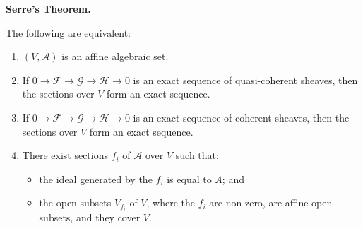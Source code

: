 \documentclass[british]{article}
\providecommand{\tightlist}{%
\setlength{\itemsep}{0pt}\setlength{\parskip}{0pt}}
\newenvironment{itenv}[1]
  {\phantomsection\par\smallskip\noindent\textbf{#1.}\itshape}
  {\par\smallskip}
\begin{document}
\begin{itenv}{Serre's Theorem}

The following are equivalent:

\begin{enumerate}
\def\labelenumi{\alph{enumi}.}
\tightlist
\item
  \((V,{\mathscr{A}})\) is an affine algebraic set.
\item
  If \(0\to{\mathscr{F}}\to{\mathscr{G}}\to{\mathscr{H}}\to0\) is an
  exact sequence of quasi-coherent sheaves, then the sections over \(V\)
  form an exact sequence.
\item
  If \(0\to{\mathscr{F}}\to{\mathscr{G}}\to{\mathscr{H}}\to0\) is an
  exact sequence of coherent sheaves, then the sections over \(V\) form
  an exact sequence.
\item
  There exist sections \(f_i\) of \({\mathscr{A}}\) over \(V\) such
  that:

  \begin{itemize}
  \tightlist
  \item
    the ideal generated by the \(f_i\) is equal to \(A\); and
  \item
    the open subsets \(V_{f_i}\) of \(V\), where the \(f_i\) are
    non-zero, are affine open subsets, and they cover \(V\).
  \end{itemize}
\end{enumerate}

\end{itenv}
\end{document}
